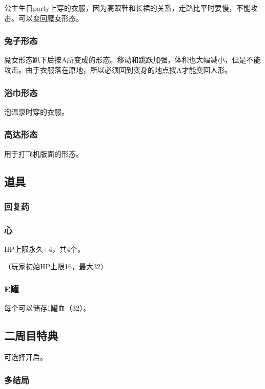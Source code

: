 \documentclass{article}
\begin{document}
公主生日party上穿的衣服，因为高跟鞋和长裙的关系，走路比平时要慢，不能攻击。可以变回魔女形态。

\subsubsection{兔子形态}
\label{costume_bunny}

魔女形态趴下后按A所变成的形态。移动和跳跃加强，体积也大幅减小，但是不能攻击。由于衣服落在原地，所以必须回到变身的地点按A才能变回人形。

\subsubsection{浴巾形态}
\label{costume_bathtowel}

泡温泉时穿的衣服。

\subsubsection{高达形态}
\label{costume_gundam}

用于打飞机版面的形态。

\subsection{道具}

\subsubsection{回复药}

\subsubsection{心}

HP上限永久+4，共4个。

（玩家初始HP上限16，最大32）

\subsubsection{E罐}

每个可以储存1罐血（32）。

\subsection{二周目特典}

可选择开启。

\subsubsection{多结局}
\end{document}
